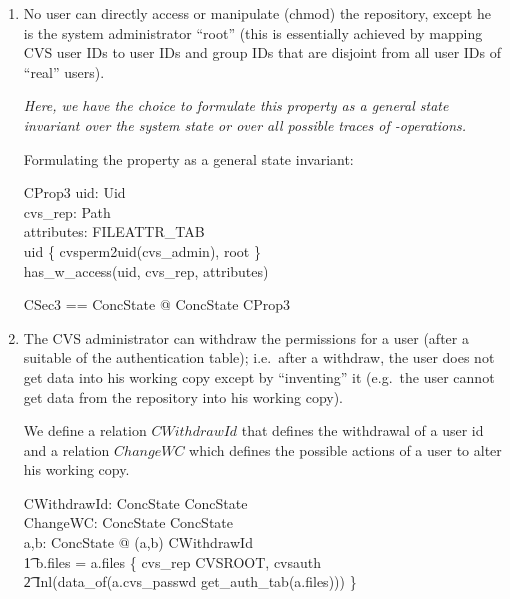 \begin{enumerate}
\item No user can directly access or manipulate (chmod) the repository, except
  he is the system administrator ``root'' (this is essentially achieved by
  mapping CVS user IDs to \unix user IDs and group IDs that are disjoint from
  all user IDs of ``real'' users).
  
  \emph{Here, we have the choice to formulate this property as a general state
    invariant over the system state or over all possible traces of
    \unix-operations.}

  Formulating the property as a general state invariant:
  \begin{schema}{CProp3}
    uid: Uid \\
    cvs\_rep: Path \\
    attributes: FILEATTR\_TAB \\
    \where
    uid \notin \{ cvsperm2uid(cvs\_admin), root \} \\
    \lnot has\_w\_access(uid, cvs\_rep, attributes) \\
  \end{schema}
  \begin{zed}
    CSec3 == \forall ConcState @ ConcState \land CProp3 \\
  \end{zed}
  
\item The CVS administrator can withdraw the permissions for a user (after a
  suitable  of the authentication table); i.e.\ after a withdraw,
  the user does not get data into his working copy except by ``inventing'' it
  (e.g.\ the user cannot get data from the repository into his working copy).
  \label{item:withdraw}
  
  We define a relation $CWithdrawId$ that defines the withdrawal of a user id
  and a relation $ChangeWC$ which defines the possible actions of a user to
  alter his working copy.
  \begin{axdef}
    CWithdrawId: ConcState \rel ConcState \\
    ChangeWC: ConcState \rel ConcState \\
    \where
    \forall a,b: ConcState @ (a,b) \in CWithdrawId \iff \\ 
    \t1 b.files = a.files \oplus \{ cvs\_rep \cat \langle CVSROOT, cvsauth
    \rangle \mapsto \\ 
    \t2 Inl(data\_of(a.cvs\_passwd \ndres get\_auth\_tab(a.files))) \} \\ 


\end{axdef}
\end{enumerate}
